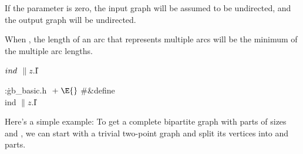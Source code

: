 If the  parameter is zero, the input graph will be assumed to
be undirected, and the output graph will be undirected.

When , the length of an arc that represents multiple
arcs
will be the minimum of the multiple arc lengths.

\Y\B\4\D$\\{ind}$ \5
$\|z.{}$\|I\par
\Y\B\4:\.{gb\_basic.h }\X${}\mathrel+\E{}$\6
\8\#\&{define} \\{ind} \5${}\|z.{}$\|I\par
\fi

Here's a simple example: To get a complete bipartite graph with
parts of sizes  and , we can start with a trivial
two-point
graph and split its vertices into  and  parts.

